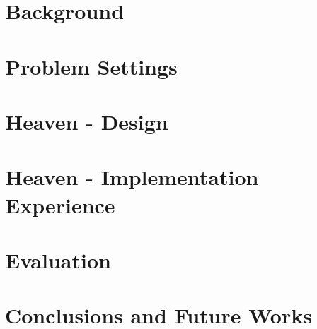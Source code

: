 \documentclass[12pt,a4paper,twoside,openright]{report}
\begin{document}
\chapter{Background}
\label{chap:background}


\chapter{Problem Settings}
\label{chap:problem-settings}



\chapter{Heaven - Design}
\label{chap:heaven}



\chapter{Heaven - Implementation Experience}
\label{chap:implementation-experience}





\chapter{Evaluation}
\label{chap:evaluation}


\chapter{Conclusions and Future Works}
\label{chap:conclusions}

\end{document}
